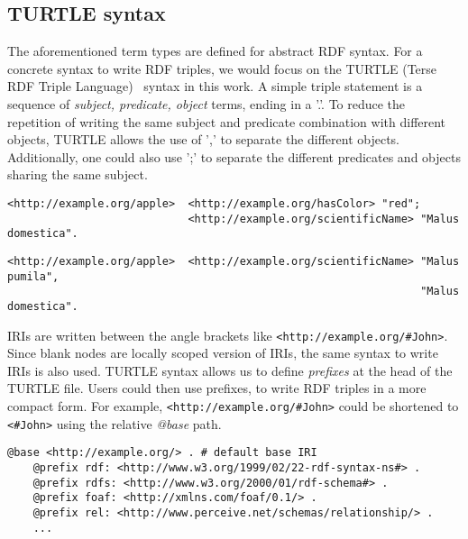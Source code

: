 \subsection{TURTLE syntax}
The aforementioned term types are defined for abstract RDF syntax. For a concrete syntax to write
RDF triples, we would focus on the TURTLE (Terse RDF Triple Language)~\cite{turtle_syntax}
syntax in this work. A simple triple statement is a sequence of
\textit{subject, predicate, object} terms, ending in a '.'.
To reduce the repetition of writing the same subject and predicate combination with
different objects, TURTLE allows the use of ',' to separate the different objects.
Additionally, one could also use ';' to separate the different predicates and objects sharing the
same subject. 


\begin{lstlisting}[label={lst:same_subject}, 
    caption={Usage of ';' where triples share the same subject.}]
<http://example.org/apple>  <http://example.org/hasColor> "red";
                            <http://example.org/scientificName> "Malus domestica".
\end{lstlisting}

\begin{lstlisting}[label={lst:different_object}, 
    caption={Usage of ',' where triples differs only in the objects.}]
<http://example.org/apple>  <http://example.org/scientificName> "Malus pumila", 
                                                                "Malus domestica".
\end{lstlisting}


IRIs are written between the angle brackets like \lstinline{<http://example.org/#John>}.
Since blank nodes are locally scoped version of IRIs, the same syntax to write IRIs is also used.
TURTLE syntax allows us to define \textit{prefixes} at the head of the TURTLE file.
Users could then use prefixes, to write RDF triples in a more compact form. For example,
\lstinline{<http://example.org/#John>} could be shortened to
\lstinline{<#John>} using the relative \textit{@base} path.

\begin{lstlisting}[caption=Prefixes in TURTLE syntax.]
    @base <http://example.org/> . # default base IRI
    @prefix rdf: <http://www.w3.org/1999/02/22-rdf-syntax-ns#> .
    @prefix rdfs: <http://www.w3.org/2000/01/rdf-schema#> .
    @prefix foaf: <http://xmlns.com/foaf/0.1/> .
    @prefix rel: <http://www.perceive.net/schemas/relationship/> . 
    ... 
\end{lstlisting}

